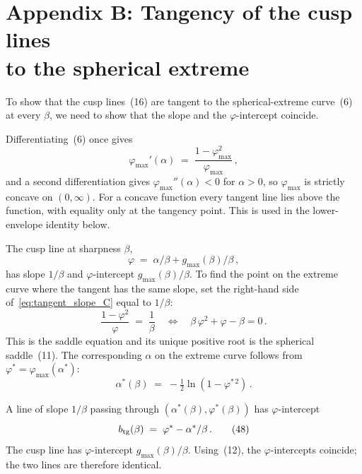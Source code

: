 \documentclass[letterpaper]{article} %
\newcommand{\Bnet}{\beta}
\begin{document}
\section{Appendix B: Tangency of the cusp lines \\to the spherical extreme}

To show that the cusp lines~(16) are tangent to the
spherical-extreme curve~(6) at every
$\Bnet$, we need to show that the slope and the $\varphi$-intercept
coincide.

Differentiating~(6) once gives
\begin{equation}
\varphi_{\max}'(\alpha) \;=\; \frac{1-\varphi_{\max}^2}{\varphi_{\max}}\,,
\tag{44}
\label{eq:tangent_slope_C}
\end{equation}
and a second differentiation gives $\varphi_{\max}''(\alpha) < 0$ for $\alpha > 0$,
so $\varphi_{\max}$ is strictly concave on $(0, \infty)$. For a concave function
every tangent line lies above the function, with equality only at the tangency
point. This is used in the lower-envelope identity below.

The cusp line at sharpness $\Bnet$,
\begin{equation}
\varphi \;=\; \alpha/\Bnet + g_{\max}(\Bnet)/\Bnet\,,
\tag{45}
\end{equation}
has slope $1/\Bnet$ and $\varphi$-intercept $g_{\max}(\Bnet)/\Bnet$. To find the point on
the extreme curve where the tangent has the same slope, set the right-hand side
of~\eqref{eq:tangent_slope_C} equal to $1/\Bnet$:
\begin{equation}
\frac{1-\varphi^2}{\varphi} \;=\; \frac{1}{\Bnet}
\quad\Longleftrightarrow\quad
\Bnet\,\varphi^2 + \varphi - \Bnet = 0\,.
\tag{46}
\label{eq:saddle_eq_C}
\end{equation}
This is the saddle equation and its unique positive root is the spherical saddle~(11).
The corresponding $\alpha$ on the extreme curve follows from
$\varphi^* = \varphi_{\max}(\alpha^*)$:
\begin{equation}
\alpha^*(\Bnet) \;=\; -\tfrac12 \ln(1-\varphi^{*\,2})\,.
\tag{47}
\label{eq:alpha_star_C}
\end{equation}

A line of slope $1/\Bnet$ passing through $(\alpha^*(\Bnet), \varphi^*(\Bnet))$ has
$\varphi$-intercept
\begin{equation}
b_{\rm tg}(\Bnet) \;=\; \varphi^* - \alpha^*/\Bnet\,.
\tag{48}
\end{equation}
The cusp line has $\varphi$-intercept $g_{\max}(\Bnet)/\Bnet$.
Using~(12), the $\varphi$-intercepts coincide;
the two lines are therefore identical.
\end{document}

